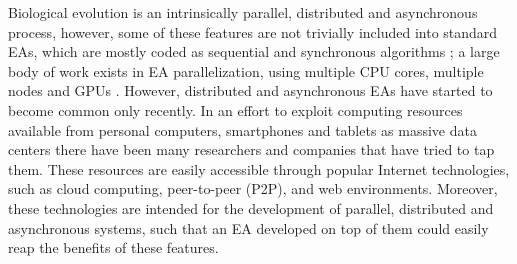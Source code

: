 \documentclass{llncs}
\begin{document}
Biological evolution is an intrinsically parallel, distributed and asynchronous process, however, 
some of these features are not trivially included into standard EAs,  which are mostly coded as sequential 
and synchronous algorithms \cite{eiben};  a large body of work exists in EA parallelization, 
using multiple CPU cores, multiple nodes and GPUs \cite{cantu2000efficient}.
However, distributed and asynchronous EAs have started to become common only recently. In an effort to
exploit computing resources available from personal computers,
smartphones and tablets as massive data centers there have been many
researchers and companies that have tried to tap them. 
These resources are easily accessible through popular Internet technologies, such as cloud computing, 
peer-to-peer (P2P), and web environments. Moreover, these technologies are intended for the development 
of parallel, distributed and asynchronous systems, such that an EA developed on top of them could easily 
reap the benefits of these features.
\end{document}
